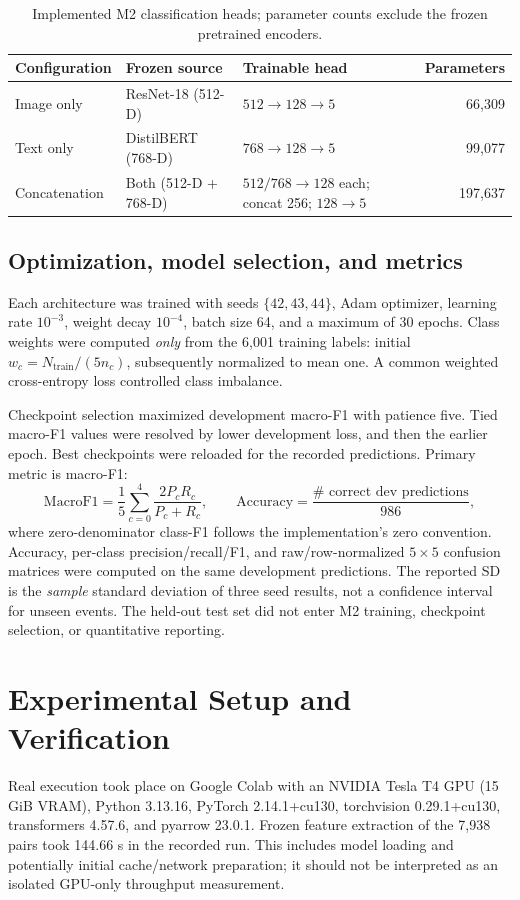 \documentclass[11pt,a4paper]{article}
\begin{document}
\begin{table}[htbp]
\centering\small
\caption{Implemented M2 classification heads; parameter counts exclude the frozen pretrained encoders.}
\label{tab:models}
\begin{tabularx}{\linewidth}{@{}l>{\raggedright\arraybackslash}X>{\raggedright\arraybackslash}Xr@{}}
\toprule
Configuration & Frozen source & Trainable head & Parameters \\
\midrule
Image only & ResNet-18 (512-D) & $512\to128\to5$ & 66,309 \\
Text only & DistilBERT (768-D) & $768\to128\to5$ & 99,077 \\
Concatenation & Both (512-D + 768-D) & $512/768\to128$ each; concat 256; $128\to5$ & 197,637 \\
\bottomrule
\end{tabularx}
\end{table}

\subsection{Optimization, model selection, and metrics}
Each architecture was trained with seeds $\{42,43,44\}$, Adam optimizer, learning rate $10^{-3}$, weight decay $10^{-4}$, batch size 64, and a maximum of 30 epochs. Class weights were computed \emph{only} from the 6,001 training labels: initial $w_c=N_{\mathrm{train}}/(5n_c)$, subsequently normalized to mean one. A common weighted cross-entropy loss controlled class imbalance.

Checkpoint selection maximized development macro-F1 with patience five. Tied macro-F1 values were resolved by lower development loss, and then the earlier epoch. Best checkpoints were reloaded for the recorded predictions. Primary metric is macro-F1:
\begin{equation}
\mathrm{MacroF1}=\frac{1}{5}\sum_{c=0}^{4}\frac{2P_cR_c}{P_c+R_c},\qquad
\mathrm{Accuracy}=\frac{\#\text{ correct dev predictions}}{986},
\end{equation}
where zero-denominator class-F1 follows the implementation's zero convention. Accuracy, per-class precision/recall/F1, and raw/row-normalized $5\times5$ confusion matrices were computed on the same development predictions. The reported SD is the \emph{sample} standard deviation of three seed results, not a confidence interval for unseen events. The held-out test set did not enter M2 training, checkpoint selection, or quantitative reporting.

\section{Experimental Setup and Verification}
Real execution took place on Google Colab with an NVIDIA Tesla T4 GPU (15 GiB VRAM), Python 3.13.16, PyTorch 2.14.1+cu130, torchvision 0.29.1+cu130, transformers 4.57.6, and pyarrow 23.0.1. Frozen feature extraction of the 7,938 pairs took 144.66 s in the recorded run. This includes model loading and potentially initial cache/network preparation; it should not be interpreted as an isolated GPU-only throughput measurement.
\end{document}
